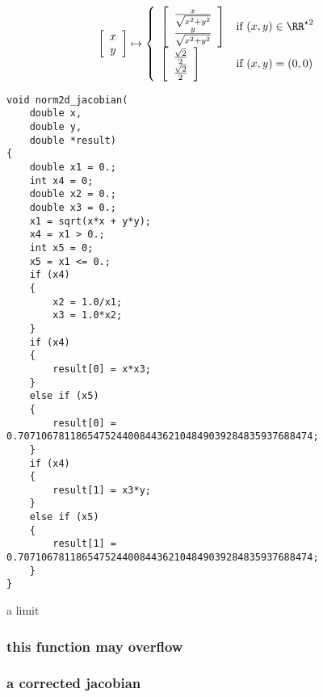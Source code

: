 \documentclass[a4paper]{article}
\begin{document}
\begin{equation}
  \begin{array}{ll}
    \left [
      \begin{array}{c}
        x\\
        y
      \end{array} \right]
    \mapsto \left\{
        \begin{array}{ll}
          \left[
            \begin{array}{c}
            \frac{x}{\sqrt{x^2+y^2}}\\
            \frac{y}{\sqrt{x^2+y^2}}
          \end{array} \right] & \mbox{if } (x, y) \in \RR^{\star 2} \\
        \left[
          \begin{array}{c}
            \frac{\sqrt{2}}{2}\\
            \frac{\sqrt{2}}{2}
          \end{array} \right] & \mbox{if } (x, y) = (0, 0)
        
      \end{array}
    \right.
  \end{array}
\end{equation}


\begin{listing}[H] 
  \begin{verbatim}
void norm2d_jacobian(
    double x,
    double y,
    double *result)
{
    double x1 = 0.;
    int x4 = 0;
    double x2 = 0.;
    double x3 = 0.;
    x1 = sqrt(x*x + y*y);
    x4 = x1 > 0.;
    int x5 = 0;
    x5 = x1 <= 0.;
    if (x4)
    {
        x2 = 1.0/x1;
        x3 = 1.0*x2;
    }
    if (x4)
    {
        result[0] = x*x3;
    }
    else if (x5)
    {
        result[0] = 0.707106781186547524400844362104849039284835937688474;
    }
    if (x4)
    {
        result[1] = x3*y;
    }
    else if (x5)
    {
        result[1] = 0.707106781186547524400844362104849039284835937688474;
    }
}
\end{verbatim}
\caption{a limit}
\end{listing}

\subsubsection{this function may overflow}

\subsubsection{a corrected jacobian}
\end{document}
